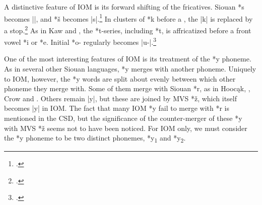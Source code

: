 \documentclass[output=paper]{LSP/langsci}
\begin{document}

A distinctive feature of IOM is its forward shifting of the fricatives.  Siouan *s becomes ||, and *š becomes |s|.\footnote{\citealt[245]{Rankinetal2006PDF}. } In clusters of *k before a , the |k| is replaced by a  stop.\footnote{\citealt[857]{Rankinetal2006PDF}.}  As in Kaw and , the *t-series, including *t\textsuperscript{}, is affricatized before a front vowel *i or *e.  Initial *o- regularly becomes |u-|.\footnote{\citealt[893]{Rankinetal2006PDF}.}

One of the most interesting features of IOM is its treatment of the  *y phoneme.  As in several other Siouan languages,  *y merges with another phoneme.  Uniquely to IOM, however, the *y words are split about evenly between which other phoneme they merge with.  Some of them merge with Siouan *r, as in Hooc\k{a}k, , Crow and .  Others remain |y|, but these are joined by MVS *\v{z}, which itself becomes |y| in IOM.  The fact that many IOM *y fail to merge with *r is mentioned in the CSD, but the significance of the counter-merger of these *y with MVS *\v{z} seems not to have been noticed.  For IOM only, we must consider the *y phoneme to be two distinct phonemes, *y\textsubscript{1} and *y\textsubscript{2}.
\end{document}
